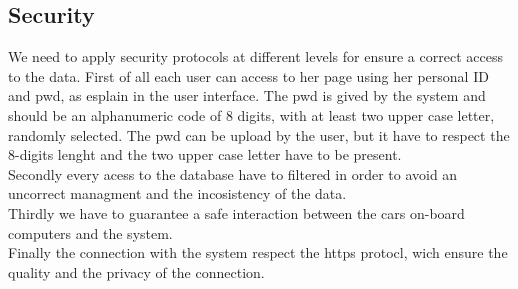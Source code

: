 \subsection{Security}
We need to apply security protocols at different levels for ensure a correct access to the data. First of all each user can access to her page using her personal \gls{ID} and \gls{pwd}, as esplain in the user interface. The \gls{pwd} is gived by the system and should be an alphanumeric code of 8 digits, with at least two upper case letter, randomly selected. The \gls{pwd} can be upload by the user, but it have to respect the 8-digits lenght and the two upper case letter have to be present.
\\Secondly every acess to the database have to filtered in order to avoid an uncorrect managment and the incosistency of the data.
\\Thirdly we have to guarantee a safe interaction between the cars on-board computers and the system. 
\\Finally the connection with the system respect the https protocl, wich ensure the quality and the privacy of the connection.
